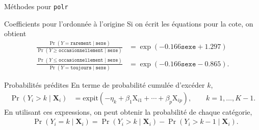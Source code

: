 \documentclass[
  ignorenonframetext,
]{beamer}
\newenvironment{Shaded}{\begin{snugshade}}{\end{snugshade}}
\newcommand{\CommentTok}[1]{\textcolor[rgb]{0.37,0.37,0.37}{#1}}
\newcommand{\FunctionTok}[1]{\textcolor[rgb]{0.28,0.35,0.67}{#1}}
\newcommand{\NormalTok}[1]{\textcolor[rgb]{0.00,0.23,0.31}{#1}}
\newcommand{\SpecialCharTok}[1]{\textcolor[rgb]{0.37,0.37,0.37}{#1}}
\begin{document}
\begin{frame}[fragile]{Méthodes pour \texttt{polr}}
\protect\hypertarget{muxe9thodes-pour-polr}{}
\begin{Shaded}
\end{Shaded}
\end{frame}

\begin{frame}{Coefficients pour l'ordonnée à l'origine}
\protect\hypertarget{coefficients-pour-lordonnuxe9e-uxe0-lorigine}{}
Si on écrit les équations pour la cote, on obtient \begin{align*}
\frac{\Pr(Y = \texttt{rarement} \mid \texttt{sexe})}{\Pr(Y \geq \texttt{occasionnellement} \mid \texttt{sexe})} &= \exp(-0.166\texttt{sexe} + 1.297) \\ 
\frac{\Pr(Y \leq \texttt{occasionnellement} \mid \texttt{sexe})}{\Pr(Y = \texttt{toujours} \mid \texttt{sexe})} &= \exp(-0.166\texttt{sexe} - 0.865).
\end{align*}
\end{frame}

\begin{frame}{Probabilités prédites}
\protect\hypertarget{probabilituxe9s-pruxe9dites}{}
En terme de probabilité cumulée d'excéder \(k\), \begin{align*}
\Pr(Y_i > k \mid \mathbf{X}_i) &= \textrm{expit}(-\eta_k + \beta_1 \mathrm{X}_{i1} + \cdots + \beta_p \mathrm{X}_{ip}), \qquad k=1, \ldots, K-1.
\end{align*} En utilisant ces expressions, on peut obtenir la
probabilité de chaque catégorie, \begin{align*}
&\Pr(Y_i = k \mid \mathbf{X}_{i}) =\Pr(Y_i > k \mid \mathbf{X}_{i}) - \Pr(Y_i > k-1 \mid \mathbf{X}_{i}).
\end{align*}
\end{frame}
\end{document}
